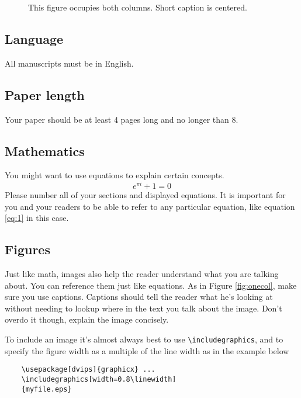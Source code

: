 \documentclass[10pt,twocolumn,letterpaper]{article}
\begin{document}
\begin{figure*}
	\begin{center}
		\fbox{\rule{0pt}{2in} \rule{.9\linewidth}{0pt}}
	\end{center}
	\caption{This figure occupies both columns. Short caption is centered.}
	\label{fig:short}
\end{figure*}


\subsection{Language}

All manuscripts must be in English.

\subsection{Paper length}
Your paper should be at least 4 pages long and no longer than 8.


\subsection{Mathematics}
You might want to use equations to explain certain concepts. 
\begin{equation} \label{eq:1}
e^{\pi i} + 1 = 0
\end{equation}
Please number all of your sections and displayed equations.  It is
important for you and your readers to be able to refer to any particular 
equation, like equation \ref{eq:1} in this case. 


\subsection{Figures}
Just like math, images also help the reader understand what you are talking
about. You can reference them just like equations. As in Figure \ref{fig:onecol}, 
make sure you use captions. Captions should tell the reader what he's looking at
without needing to lookup where in the text you talk about the image. Don't 
overdo it though, explain the image concisely. 

To include an image it's almost always best to use \verb+\includegraphics+, and 
to specify the  figure width as a multiple of the line width as in the example
below
{\small\begin{verbatim}
	\usepackage[dvips]{graphicx} ...
	\includegraphics[width=0.8\linewidth]
	{myfile.eps}
	\end{verbatim}
}
\end{document}
